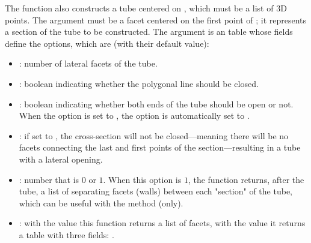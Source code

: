 The function  also constructs a tube centered on , which must be a list of 3D points. The argument  must be a facet centered on the first point of ; it represents a section of the tube to be constructed. The argument  is an table whose fields define the options, which are (with their default value):
\begin{itemize}
    \item {}: number of lateral facets of the tube.
    
    \item {}: boolean indicating whether the polygonal line should be closed.
    
    \item {}: boolean indicating whether both ends of the tube should be open or not. When the  option is set to \true, the  option is automatically set to \true.   
        
    \item {} : if set to \true, the cross-section will not be closed—meaning there will be no facets connecting the last and first points of the section—resulting in a tube with a lateral opening.
        
    \item {}: number that is $0$ or $1$. When this option is $1$, the function returns, after the tube, a list of separating facets (walls) between each "section" of the tube, which can be useful with the  method (only).
    
    \item {} : with the value \false this function returns a list of facets, with the value \true it returns a table with three fields: . 
\end{itemize}

